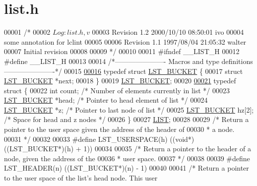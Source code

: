 \hypertarget{list_8h_source}{}\section{list.\+h}
\label{list_8h_source}

\begin{DoxyCode}
00001 \textcolor{comment}{/*}
00002 \textcolor{comment}{  $Log: list.h,v $}
00003 \textcolor{comment}{  Revision 1.2  2000/10/10 08:50:01  ivo}
00004 \textcolor{comment}{  some annotation for lclint}
00005 \textcolor{comment}{}
00006 \textcolor{comment}{  Revision 1.1  1997/08/04 21:05:32  walter}
00007 \textcolor{comment}{  Initial revision}
00008 \textcolor{comment}{}
00009 \textcolor{comment}{*/}
00010 
00011 \textcolor{preprocessor}{#ifndef \_\_LIST\_H}
00012 \textcolor{preprocessor}{#define \_\_LIST\_H}
00013 
00014 \textcolor{comment}{/*---------------------- Macros and type definitions ----------------------*/}
00015 
\hypertarget{list_8h_source_l00016}{}\hyperlink{structLST__BUCKET}{00016} \textcolor{keyword}{typedef} \textcolor{keyword}{struct }\hyperlink{structLST__BUCKET}{LST\_BUCKET} \{
00017   \textcolor{keyword}{struct }\hyperlink{structLST__BUCKET}{LST\_BUCKET} *next;
00018 \}
00019 \hyperlink{structLST__BUCKET}{LST\_BUCKET};
00020 
\hypertarget{list_8h_source_l00021}{}\hyperlink{structLIST}{00021} \textcolor{keyword}{typedef} \textcolor{keyword}{struct }\{
00022   \textcolor{keywordtype}{int} count;      \textcolor{comment}{/* Number of elements currently in list */}
00023   \hyperlink{structLST__BUCKET}{LST\_BUCKET} *head;   \textcolor{comment}{/* Pointer to head element of list      */}
00024   \hyperlink{structLST__BUCKET}{LST\_BUCKET} *z;    \textcolor{comment}{/* Pointer to last node of list         */}
00025   \hyperlink{structLST__BUCKET}{LST\_BUCKET} hz[2];   \textcolor{comment}{/* Space for head and z nodes           */}
00026 \}
00027 \hyperlink{structLIST}{LIST};
00028 
00029 \textcolor{comment}{/* Return a pointer to the user space given the address of the header of}
00030 \textcolor{comment}{ * a node.}
00031 \textcolor{comment}{ */}
00032 
00033 \textcolor{preprocessor}{#define LST\_USERSPACE(h)  ((void*)((LST\_BUCKET*)(h) + 1))}
00034 
00035 \textcolor{comment}{/* Return a pointer to the header of a node, given the address of the}
00036 \textcolor{comment}{ * user space.}
00037 \textcolor{comment}{ */}
00038 
00039 \textcolor{preprocessor}{#define LST\_HEADER(n)   ((LST\_BUCKET*)(n) - 1)}
00040 
00041 \textcolor{comment}{/* Return a pointer to the user space of the list's head node. This user}

\end{DoxyCode}
